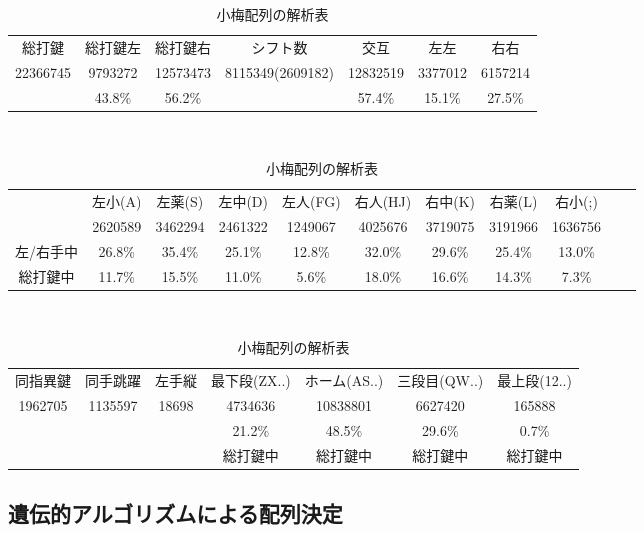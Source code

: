 \begin{table}[htbp]
 \caption{小梅配列の解析表}
 \begin{center}
 \begin{tabular}{cccc|ccc}
 \hline
総打鍵 & 総打鍵左 & 総打鍵右 & シフト数 & 交互 & 左左 & 右右 \\
 22366745 & 9793272 & 12573473 & 8115349(2609182) & 12832519 & 3377012 & 6157214\\
 & 43.8\% & 56.2\% &  & 57.4\% & 15.1\% & 27.5\%\\
 \hline
 \end{tabular}

 　\vspace{1zw}　

 \begin{tabular}{ccccccccccc}
 \hline
& 左小(A) & 左薬(S) & 左中(D) & 左人(FG) & 右人(HJ) & 右中(K) & 右薬(L) & 右小(;)\\
& 2620589 & 3462294 & 2461322 & 1249067 & 4025676 & 3719075 & 3191966 & 1636756\\
左/右手中 & 26.8\% & 35.4\% & 25.1\% & 12.8\% & 32.0\% & 29.6\% & 25.4\% & 13.0\%\\
総打鍵中 & 11.7\% & 15.5\% & 11.0\% & 5.6\% & 18.0\% & 16.6\% & 14.3\% & 7.3\%\\
\hline
 \end{tabular}

 　\vspace{1zw}　

 \begin{tabular}{ccc|cccc}
 \hline
 同指異鍵 & 同手跳躍 & 左手縦 & 最下段(ZX..) & ホーム(AS..) & 三段目(QW..) & 最上段(12..)\\
1962705 & 1135597 & 18698 & 4734636 & 10838801 & 6627420 & 165888\\
 &  &  & 21.2\% & 48.5\% & 29.6\% & 0.7\%\\
 &  &  & 総打鍵中 & 総打鍵中 & 総打鍵中 & 総打鍵中\\
\hline
 \end{tabular}
 \end{center}
 \label{tbl:roma}
\end{table}


\subsection{遺伝的アルゴリズムによる配列決定}


